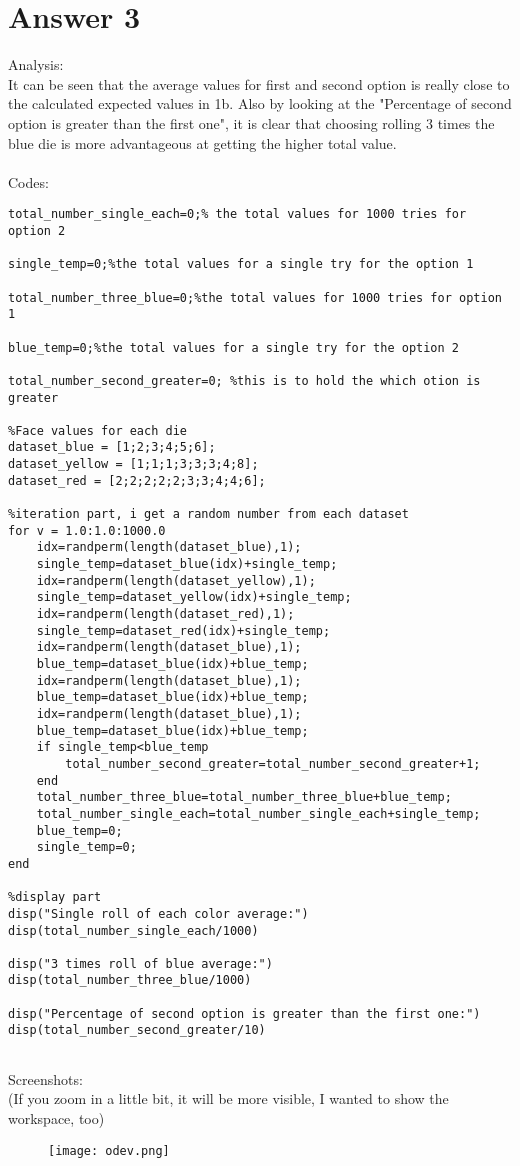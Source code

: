 \documentclass[12pt]{article}
\begin{document}
\section*{Answer 3}
Analysis:\\
It can be seen that the average values for first and second option is really close to the calculated expected values in 1b. Also by looking at the "Percentage of second option is greater than the first one", it is clear that choosing rolling 3 times the blue die is more advantageous at getting the higher total value.\\\\
Codes:\\
\begin{lstlisting}[style=Matlab-editor]
total_number_single_each=0;% the total values for 1000 tries for option 2

single_temp=0;%the total values for a single try for the option 1

total_number_three_blue=0;%the total values for 1000 tries for option 1

blue_temp=0;%the total values for a single try for the option 2

total_number_second_greater=0; %this is to hold the which otion is greater

%Face values for each die
dataset_blue = [1;2;3;4;5;6];
dataset_yellow = [1;1;1;3;3;3;4;8];
dataset_red = [2;2;2;2;2;3;3;4;4;6];

%iteration part, i get a random number from each dataset
for v = 1.0:1.0:1000.0
	idx=randperm(length(dataset_blue),1);
	single_temp=dataset_blue(idx)+single_temp;
	idx=randperm(length(dataset_yellow),1);
	single_temp=dataset_yellow(idx)+single_temp; 
	idx=randperm(length(dataset_red),1);
	single_temp=dataset_red(idx)+single_temp;
	idx=randperm(length(dataset_blue),1);
	blue_temp=dataset_blue(idx)+blue_temp;
	idx=randperm(length(dataset_blue),1);
	blue_temp=dataset_blue(idx)+blue_temp;
	idx=randperm(length(dataset_blue),1);
	blue_temp=dataset_blue(idx)+blue_temp;
	if single_temp<blue_temp
		total_number_second_greater=total_number_second_greater+1;
	end
	total_number_three_blue=total_number_three_blue+blue_temp;
	total_number_single_each=total_number_single_each+single_temp;
	blue_temp=0;
	single_temp=0;
end

%display part
disp("Single roll of each color average:")
disp(total_number_single_each/1000)

disp("3 times roll of blue average:")
disp(total_number_three_blue/1000)

disp("Percentage of second option is greater than the first one:")
disp(total_number_second_greater/10)


\end{lstlisting}
Screenshots:\\
(If you zoom in a little bit, it will be more visible, I wanted to show the workspace, too)\\
\begin{figure}[H]
  \texttt{[image: odev.png]}
  \centering
  \label{fig 1:output}
\end{figure}
\end{document}

